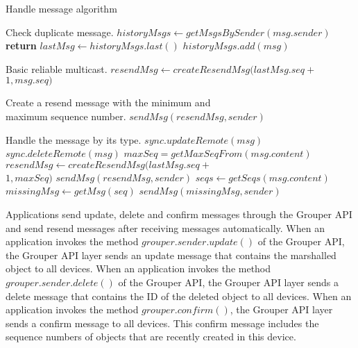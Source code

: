 \begin{algorithm}[t]
	\caption{Handle message algorithm}\label{alg:euclid}
	\begin{algorithmic}[1]		
		\LeftComment Check duplicate message.
		\State  $historyMsgs \gets getMsgsBySender(msg.sender)$
		\State \textbf{return}
		\EndIf
		\State $lastMsg \gets historyMsgs.last()$
		\State $historyMsgs.add(msg)$
		
		\LeftComment Basic reliable multicast.
		\State $resendMsg \gets createResendMsg(lastMsg.seq + $ \\\hspace{2.7cm} $1, msg.seq)$
		
		\Comment Create a resend message with the minimum and \\\hspace{1.7cm} maximum sequence number.
		\State $sendMsg(resendMsg, sender)$
		\EndIf
		
		\LeftComment Handle the message by its type.
		\State $sync.updateRemote(msg)$
		\State $sync.deleteRemote(msg)$
		\State $maxSeq = getMaxSeqFrom(msg.content)$
		\State $resendMsg \gets createResendMsg(lastMsg.seq + $ \\\hspace{2.7cm}  $1, maxSeq)$
		\State $sendMsg(resendMsg, sender)$
		\EndIf
		\State $seqs \gets getSeqs(msg.content)$
		\State $missingMsg \gets getMsg(seq)$
		\State $sendMsg(missingMsg, sender)$
		\EndFor
		\EndIf
		\EndProcedure
	\end{algorithmic}
\end{algorithm}

Applications send update, delete and confirm messages through the Grouper API and send resend messages after receiving messages automatically.
When an application invokes the method $grouper.sender.update()$ of the Grouper API, the Grouper API layer sends an update message that contains the marshalled object to all devices.
When an application invokes the method $grouper.sender.delete()$ of the Grouper API, the Grouper API layer sends a delete message that contains the ID of the deleted object to all devices. 
When an application invokes the method $grouper.confirm()$, the Grouper API layer sends a confirm message to all devices. 
This confirm message includes the sequence numbers of objects that are recently created in this device.

